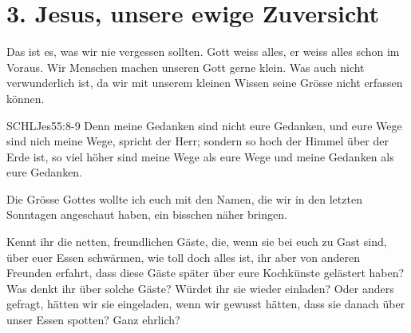 \documentclass[fontsize=16pt]{mybib}
\begin{document}
    \section{3. Jesus, unsere ewige Zuversicht}
    Das ist es, was wir nie vergessen sollten. Gott weiss alles, er weiss alles schon im Voraus. Wir Menschen machen unseren Gott gerne klein. Was auch nicht verwunderlich ist, da wir mit unserem kleinen Wissen seine Grösse nicht erfassen können.
    \begin{bibelbox}{SCHL}{Jes}{55:8-9}
    Denn meine Gedanken sind nicht eure Gedanken, und eure Wege sind nich meine Wege, spricht der Herr; sondern so hoch der Himmel über der Erde ist, so viel höher sind meine Wege als eure Wege und meine Gedanken als eure Gedanken.
    \end{bibelbox}
    Die Grösse Gottes wollte ich euch mit den Namen, die wir in den letzten Sonntagen angeschaut haben, ein bisschen näher bringen.

    Kennt ihr die netten, freundlichen Gäste, die, wenn sie bei euch zu Gast sind, über euer Essen schwärmen, wie toll doch alles ist, ihr aber von anderen Freunden erfahrt, dass diese Gäste später über eure Kochkünste gelästert haben? Was denkt ihr über solche Gäste? Würdet ihr sie wieder einladen? Oder anders gefragt, hätten wir sie eingeladen, wenn wir gewusst hätten, dass sie danach über unser Essen spotten? Ganz ehrlich?
\end{document}
